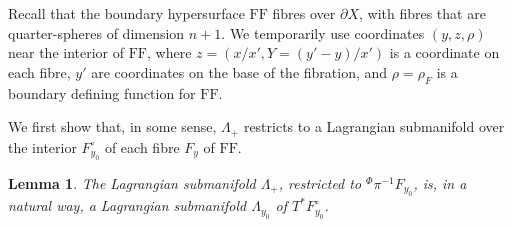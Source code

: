 \documentclass[10pt, a4paper, twoside]{amsart}
\numberwithin{equation}{section}
\newtheorem{lemma}[theorem]{Lemma}
\theoremstyle{remark}
\begin{document}
Recall that the boundary hypersurface ${\mathrm{FF}}$  fibres over $\partial X$, with fibres that are quarter-spheres of dimension $n+1$.  We temporarily use coordinates $(y, z, \rho)$ near the interior of ${\mathrm{FF}}$, where $z = (x/x', Y = (y'-y)/x')$ is a coordinate on each fibre, $y'$ are coordinates on the base of the fibration, and $\rho = \rho_F$ is a boundary defining function for ${\mathrm{FF}}$. 

We first show that, in some sense, $\Lambda_+$ restricts to a Lagrangian submanifold  over the interior $F_{y_0}^\circ$ of each fibre $F_y$ of ${\mathrm{FF}}$. 

\begin{lemma}\label{lem:Lag-fibre}
The Lagrangian submanifold $\Lambda_+$, restricted to ${}^\Phi \pi^{-1} F_{y_0}$, is, in a natural way, a Lagrangian submanifold $\Lambda_{y_0}$ of $T^* F_{y_0}^\circ$. 
\end{lemma}
\end{document}
